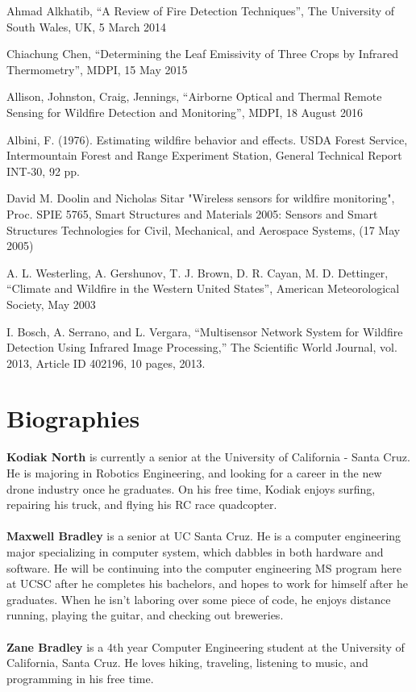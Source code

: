 \documentclass[12pt,journal,compsoc]{IEEEtran}
\begin{document}
\begin{thebibliography}{2}
Ahmad Alkhatib, “A Review of Fire Detection Techniques”, The University of South Wales, UK, 5 March 2014

Chiachung Chen, “Determining the Leaf Emissivity of Three Crops by Infrared Thermometry”, MDPI, 15 May 2015

Allison, Johnston, Craig, Jennings, “Airborne Optical and Thermal Remote Sensing for Wildfire Detection and Monitoring”, MDPI, 18 August 2016

Albini, F. (1976). Estimating wildfire behavior and effects. USDA Forest Service, Intermountain Forest and Range Experiment Station, General Technical Report INT-30, 92 pp.

David M. Doolin and Nicholas Sitar "Wireless sensors for wildfire monitoring", Proc. SPIE 5765, Smart Structures and Materials 2005: Sensors and Smart Structures Technologies for Civil, Mechanical, and Aerospace Systems, (17 May 2005)

A. L. Westerling, A. Gershunov, T. J. Brown, D. R. Cayan, M. D. Dettinger, “Climate and Wildfire in the Western United States”, American Meteorological Society, May 2003

I. Bosch, A. Serrano, and L. Vergara, “Multisensor Network System for Wildfire Detection Using Infrared Image Processing,” The Scientific World Journal, vol. 2013, Article ID 402196, 10 pages, 2013.

\end{thebibliography}

\vspace{1cm}

\section*{Biographies}
\textbf{Kodiak North}
is currently a senior at the University of California - Santa Cruz. He is majoring in Robotics Engineering, and looking for a career in the new drone industry once he graduates. On his free time, Kodiak enjoys surfing, repairing his truck, and flying his RC race quadcopter.\\\\
\noindent
\textbf{Maxwell Bradley}
is a senior at UC Santa Cruz. He is a computer engineering major specializing in computer system, which dabbles in both hardware and software. He will be continuing into the computer engineering MS program here at UCSC after he completes his bachelors, and hopes to work for himself after he graduates. When he isn't laboring over some piece of code, he enjoys distance running, playing the guitar, and checking out breweries.\\\\
\noindent
\textbf{Zane Bradley}
is a 4th year Computer Engineering student at the University of California, Santa Cruz. He loves hiking, traveling, listening to music, and programming in his free time.
\end{document}
